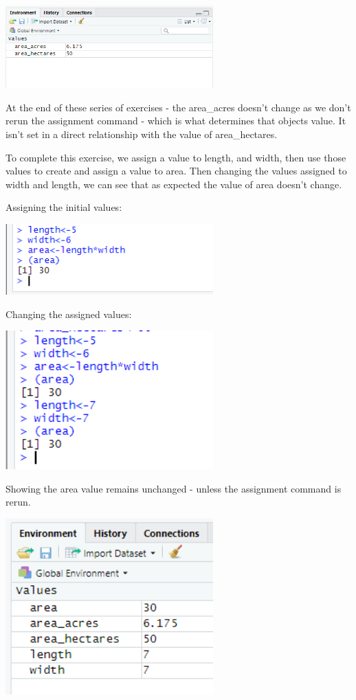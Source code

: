 \documentclass{article}
\begin{document}
\includegraphics[width=8cm]{Images/RStudio006.PNG}

At the end of these series of exercises - the area\_acres doesn't change as we don't rerun the assignment command - which is what determines that objects value. It isn't set in a direct relationship with the value of area\_hectares.

To complete this exercise, we assign a value to length, and width, then use those values to create and assign a value to area. Then changing the values assigned to width and length, we can see that as expected the value of area doesn't change.

Assigning the initial values:

\includegraphics[width=8cm]{Images/RStudio007.PNG}

Changing the assigned values:

\includegraphics[width=8cm]{Images/RStudio009.PNG}

Showing the area value remains unchanged - unless the assignment command is rerun.

\includegraphics[width=8cm]{Images/RStudio008.PNG}
\end{document}
